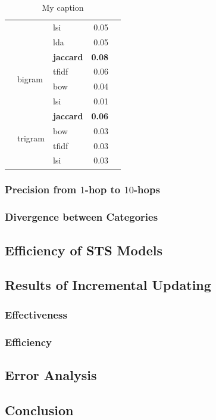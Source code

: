\begin{table}[]
\begin{tabular}{lllrl}
 &  & lsi & 0.05 &  \\
 &  & lda & 0.05 &  \\ \cline{2-5} 
 & \multirow{4}{*}{bigram} & \textbf{jaccard} & \textbf{0.08} & \textbf{} \\
 &  & tfidf & 0.06 &  \\
 &  & bow & 0.04 &  \\
 &  & lsi & 0.01 &  \\ \cline{2-5} 
 & \multirow{4}{*}{trigram} & \textbf{jaccard} & \textbf{0.06} & \textbf{} \\
 &  & bow & 0.03 &  \\
 &  & tfidf & 0.03 &  \\
 &  & lsi & 0.03 &  \\ \hline
\end{tabular}
\caption{My caption}
\label{my-label}
\end{table}


\subsubsection{Precision from $1$-hop to $10$-hops}

\subsubsection{Divergence between Categories}



\subsection{Efficiency of STS Models}
\label{sec:5.3}

\subsection{Results of Incremental Updating}
\label{sec:5.4}

\subsubsection{Effectiveness}

\subsubsection{Efficiency}

\subsection{Error Analysis}
\label{sec:5.5}

\subsection{Conclusion}
\label{sec:5.6}
